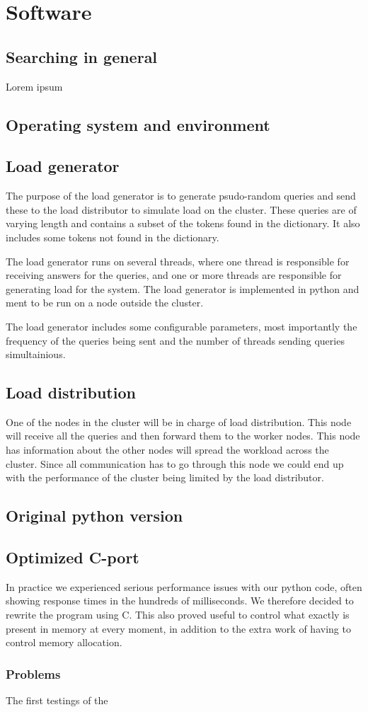 
\section{Software}
\subsection{Searching in general}
Lorem ipsum\cite{IntroIR}
\subsection{Operating system and environment}
\subsection{Load generator}
The purpose of the load generator is to generate psudo-random queries and send these to the load distributor to simulate load on the cluster. These queries are of varying length and contains a subset of the tokens found in the dictionary. It also includes some tokens not found in the dictionary. 

The load generator runs on several threads, where one thread is responsible for receiving answers for the queries, and one or more threads are responsible for generating load for the system. The load generator is implemented in python and ment to be run on a node outside the cluster.

The load generator includes some configurable parameters, most importantly the frequency of the queries being sent and the number of threads sending queries simultainious.

\subsection{Load distribution}
One of the nodes in the cluster will be in charge of load distribution. This node will receive all the queries and then forward them to the worker nodes. This node has information about the other nodes will spread the workload across the cluster. Since all communication has to go through this node we could end up with the performance of the cluster being limited by the load distributor.  

\subsection{Original python version}

\subsection{Optimized C-port}
In practice we experienced serious performance issues with our python code, often showing response times in the hundreds of milliseconds. We therefore decided to rewrite the program using C. This also proved useful to control what exactly is present in memory at every moment, in addition to the extra work of having to control memory allocation.
\subsubsection{Problems}
The first testings of the

